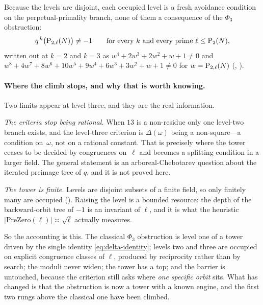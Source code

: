 \noindent
Because the levels are disjoint, each occupied level is a fresh avoidance
condition on the perpetual-primality branch, none of them a consequence of
the $\Phi_3$ obstruction:
\[
  q^{\,k}\bigl(\mathrm{P}_{2,\ell}(N)\bigr) \neq -1
  \qquad\text{for every } k \text{ and every prime } \ell \leq \mathrm{P}_{2}(N),
\]
written out at $k = 2$ and $k = 3$ as
$w^4+2w^3+2w^2+w+1 \neq 0$ and
$w^8+4w^7+8w^6+10w^5+9w^4+6w^3+3w^2+w+1 \neq 0$ for $w = \mathrm{P}_{2,\ell}(N)$
(,
 ).

\paragraph{Where the climb stops, and why that is worth knowing.}
Two limits appear at level three, and they are the real information.

\emph{The criteria stop being rational.}  When $13$ is a non-residue only
one level-two branch exists, and the level-three criterion is
$\Delta(\omega)$ being a non-square---a condition on~$\omega$, not on a
rational constant.  That is precisely where the tower ceases to be decided
by congruences on~$\ell$ and becomes a splitting condition in a larger
field.  The general statement is an arboreal-Chebotarev question about the
iterated preimage tree of $q$, and it is not proved here.

\emph{The tower is finite.}  Levels are disjoint subsets of a finite
field, so only finitely many are occupied
().
Raising the level is a bounded resource: the depth of the backward-orbit
tree of $-1$ is an invariant of $\ell$, and it is what the heuristic
$|\mathrm{PreZero}(\ell)| \asymp \sqrt{\ell}$ actually measures.

So the accounting is this.  The classical $\Phi_3$ obstruction is level one
of a tower driven by the single identity \eqref{eq:delta-identity}; levels
two and three are occupied on explicit congruence classes of $\ell$,
produced by reciprocity rather than by search; the moduli never widen; the
tower has a top; and the barrier is untouched, because the criterion still
asks where \emph{one specific orbit} sits.  What has changed is that the
obstruction is now a tower with a known engine, and the first two rungs
above the classical one have been climbed.


